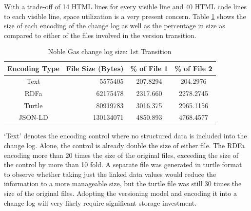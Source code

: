 With a trade-off of 14 HTML lines for every visible line and 40 HTML code lines to each visible line, space utilization is a very present concern.
Table \ref{table:Ng_changelog_table1} shows the size of each encoding of the change log as well as the percentage in size as compared to either of the files involved in the version transition.
\begin{table}
	\caption{Noble Gas change log size: 1st Transition}
	\label{table:Ng_changelog_table1}
	\centering
	\begin{tabular}{|c|r|c|c|}
		\hline
		Encoding Type & File Size (Bytes) & \% of File 1 & \% of File 2 \\
		\hline
		Text&	5575405&	207.8294&	204.2976\\
		RDFa&	62175478&	2317.660&	2278.2745\\
		Turtle&	80919783&	3016.375&	2965.1156\\
		JSON-LD&	130134071&	4850.893&	4768.4577\\
		\hline
	\end{tabular}
\end{table}
`Text' denotes the encoding control where no structured data is included into the change log.
Alone, the control is already double the size of either file.
The RDFa encoding more than 20 times the size of the original files, exceeding the size of the control by more than 10 fold.
A separate file was generated in turtle format to observe whether taking just the linked data values would reduce the information to a more manageable size, but the turtle file was still 30 times the size of the original files.
Adopting the versioning model and encoding it into a change log will very likely require significant storage investment.

